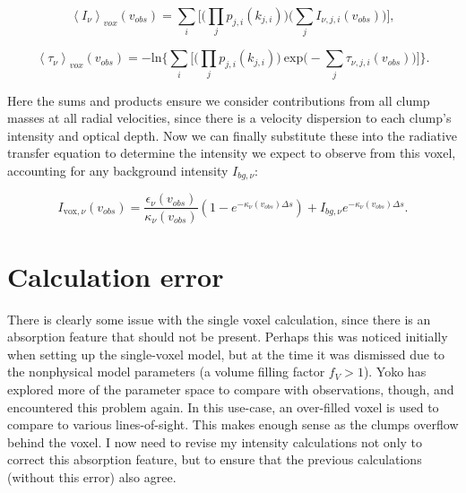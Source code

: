 \documentclass[a4paper]{article}
\begin{document}
    \begin{equation}
    \label{voxel-averaged intensity}
    \left< I_\nu \right>_{vox} (v_{obs}) = \sum_i \bigg[ \Big( \prod_j p_{j,i}(k_{j,i}) \Big) \Big( \sum_j I_{\nu,j,i} (v_{obs}) \Big) \bigg],
    \end{equation}

    \begin{equation}
    \label{voxel-averaged optical depth}
    \left< \tau_\nu \right>_{vox} (v_{obs}) = -\mathrm{ln} \Bigg\{ \sum_i \bigg[ \Big( \prod_j p_{j,i}(k_{j,i}) \Big) \ \mathrm{exp} \Big( - \sum_j \tau_{\nu,j,i} (v_{obs}) \Big) \bigg] \Bigg\}.
    \end{equation}

    Here the sums and products ensure we consider contributions from all clump masses at all radial velocities, since there is a velocity dispersion to each clump's intensity and optical depth.
    Now we can finally substitute these into the radiative transfer equation to determine the intensity we expect to observe from this voxel, accounting for any background intensity \(I_{bg, \nu}\):

    \begin{equation}
    \label{voxel intensity}
    I_{\mathrm{vox},\nu} (v_{obs}) = \frac{\epsilon_\nu (v_{obs})}{\kappa_\nu (v_{obs})} \left( 1 - e^{-\kappa_\nu (v_{obs}) \Delta s} \right) + I_{bg, \nu} e^{-\kappa_\nu (v_{obs}) \Delta s}.
    \end{equation}


    \section{Calculation error}

    There is clearly some issue with the single voxel calculation, since there is an absorption feature that should not be present.
    Perhaps this was noticed initially when setting up the single-voxel model, but at the time it was dismissed due to the nonphysical model parameters (a volume filling factor \(f_V > 1\)).
    Yoko has explored more of the parameter space to compare with observations, though, and encountered this problem again.
    In this use-case, an over-filled voxel is used to compare to various lines-of-sight.
    This makes enough sense as the clumps overflow behind the voxel.
    I now need to revise my intensity calculations not only to correct this absorption feature, but to ensure that the previous calculations (without this error) also agree.
\end{document}

